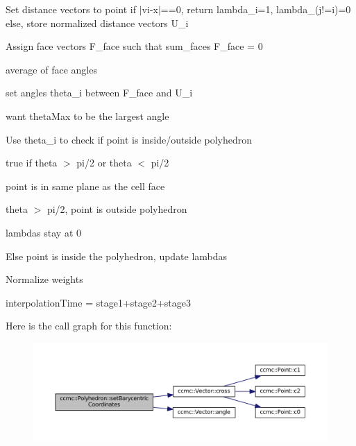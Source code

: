 Set distance vectors to point if $|$vi-\/x$|$==0, return lambda\-\_\-i=1, lambda\-\_\-(j!=i)=0 else, store normalized distance vectors U\-\_\-i

Assign face vectors F\-\_\-face such that sum\-\_\-faces F\-\_\-face = 0

average of face angles

set angles theta\-\_\-i between F\-\_\-face and U\-\_\-i

want theta\-Max to be the largest angle

Use theta\-\_\-i to check if point is inside/outside polyhedron

true if theta $>$ pi/2 or theta $<$ pi/2

point is in same plane as the cell face

theta $>$ pi/2, point is outside polyhedron

lambdas stay at 0

Else point is inside the polyhedron, update lambdas

Normalize weights

interpolation\-Time = stage1+stage2+stage3 

Here is the call graph for this function\-:\nopagebreak
\begin{figure}[H]
\begin{center}
\leavevmode
\includegraphics[width=350pt]{classccmc_1_1_polyhedron_ab0619f44fb68fae79dc86498164a5255_cgraph}
\end{center}
\end{figure}


